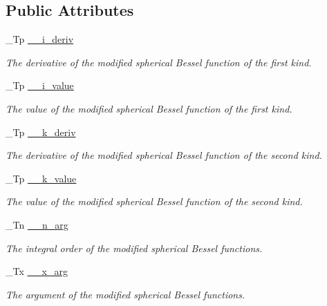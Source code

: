 \subsection*{Public Attributes}
\begin{DoxyCompactItemize}
\item 
\+\_\+\+Tp \hyperlink{struct____gnu__cxx_1_1____sph__mod__bessel__t_a362ea0ef3a2a7e941e3882bb03477f0f}{\+\_\+\+\_\+i\+\_\+deriv}
\begin{DoxyCompactList}\small\item\em The derivative of the modified spherical Bessel function of the first kind. \end{DoxyCompactList}\item 
\+\_\+\+Tp \hyperlink{struct____gnu__cxx_1_1____sph__mod__bessel__t_abecb364caffb1f335806b71c2f729d0d}{\+\_\+\+\_\+i\+\_\+value}
\begin{DoxyCompactList}\small\item\em The value of the modified spherical Bessel function of the first kind. \end{DoxyCompactList}\item 
\+\_\+\+Tp \hyperlink{struct____gnu__cxx_1_1____sph__mod__bessel__t_a4a291581457934e9d05c21e2acbedbc5}{\+\_\+\+\_\+k\+\_\+deriv}
\begin{DoxyCompactList}\small\item\em The derivative of the modified spherical Bessel function of the second kind. \end{DoxyCompactList}\item 
\+\_\+\+Tp \hyperlink{struct____gnu__cxx_1_1____sph__mod__bessel__t_af0e430aef3e7053de5474206d6f13830}{\+\_\+\+\_\+k\+\_\+value}
\begin{DoxyCompactList}\small\item\em The value of the modified spherical Bessel function of the second kind. \end{DoxyCompactList}\item 
\+\_\+\+Tn \hyperlink{struct____gnu__cxx_1_1____sph__mod__bessel__t_a3c3fb7e00b5b39d6f86c744699ed8da2}{\+\_\+\+\_\+n\+\_\+arg}
\begin{DoxyCompactList}\small\item\em The integral order of the modified spherical Bessel functions. \end{DoxyCompactList}\item 
\+\_\+\+Tx \hyperlink{struct____gnu__cxx_1_1____sph__mod__bessel__t_ae4a4e05aa107855789a3b5859f9476e9}{\+\_\+\+\_\+x\+\_\+arg}
\begin{DoxyCompactList}\small\item\em The argument of the modified spherical Bessel functions. \end{DoxyCompactList}\end{DoxyCompactItemize}


